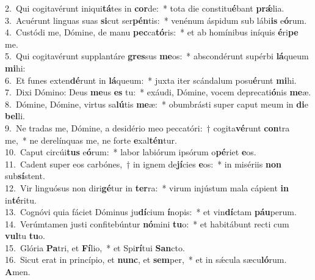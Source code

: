 {2.~}Qui cogitavérunt iniqui\textbf{tá}tes in \textbf{cor}de:~* tota die constitu\textbf{é}bant \textbf{prǽ}lia.\\
{3.~}Acuérunt linguas suas \textbf{si}cut ser\textbf{pén}tis:~* venénum áspidum sub lábi\textbf{is} e\textbf{ó}rum.\\
{4.~}Custódi me, Dómine, de manu \textbf{pec}ca\textbf{tó}ris:~* et ab homínibus iníquis \textbf{é}ri\textbf{pe} me.\\
{5.~}Qui cogitavérunt supplantáre \textbf{gres}sus \textbf{me}os:~* abscondérunt supérbi \textbf{lá}queum \textbf{mi}hi:\\
{6.~}Et funes exten\textbf{dé}runt in \textbf{lá}queum:~* juxta iter scándalum posu\textbf{é}runt \textbf{mi}hi.\\
{7.~}Dixi Dómino: Deus \textbf{me}us \textbf{es} tu:~* exáudi, Dómine, vocem deprecati\textbf{ó}nis \textbf{me}æ.\\
{8.~}Dómine, Dómine, virtus sa\textbf{lú}tis \textbf{me}æ:~* obumbrásti super caput meum in \textbf{di}e \textbf{bel}li.\\
{9.~}Ne tradas me, Dómine, a desidério meo peccatóri:~† cogita\textbf{vé}runt \textbf{con}tra me,~* ne derelínquas me, ne forte \textbf{e}xal\textbf{tén}tur.\\
{10.~}Caput circúi\textbf{tus} e\textbf{ó}rum:~* labor labiórum ipsórum o\textbf{pé}riet \textbf{e}os.\\
{11.~}Cadent super eos carbónes,~† in ignem de\textbf{jí}cies \textbf{e}os:~* in misériis \textbf{non} sub\textbf{sí}stent.\\
{12.~}Vir linguósus non diri\textbf{gé}tur in \textbf{ter}ra:~* virum injústum mala cápient \textbf{in} in\textbf{té}ritu.\\
{13.~}Cognóvi quia fáciet Dóminus ju\textbf{dí}cium \textbf{í}nopis:~* et vin\textbf{dí}ctam \textbf{páu}perum.\\
{14.~}Verúmtamen justi confitebúntur \textbf{nó}mini \textbf{tu}o:~* et habitábunt recti cum \textbf{vul}tu \textbf{tu}o.\\
{15.~}Glória \textbf{Pa}tri, et \textbf{Fí}lio,~* et Spi\textbf{rí}tui \textbf{San}cto.\\
{16.~}Sicut erat in princípio, et \textbf{nunc}, et \textbf{sem}per,~* et in sǽcula sæcu\textbf{ló}rum. \textbf{A}men.\\

